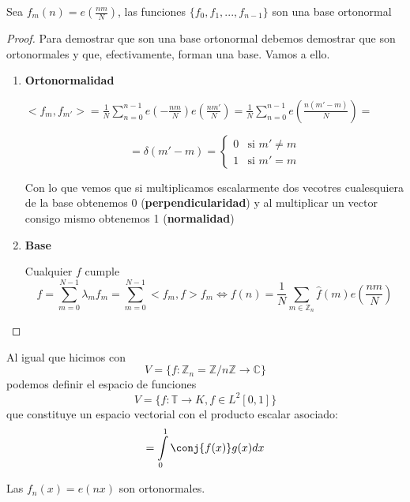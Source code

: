 \begin{prop}
	Sea $f_m(n) = e\left(\frac{nm}{N} \right) $, las funciones $\{ f_0, f_1, ..., f_{n-1}\}$ son una base ortonormal

\end{prop}

\begin{proof}
	Para demostrar que son una base ortonormal debemos demostrar que son ortonormales y que, efectivamente, forman una base. Vamos a ello.

	\begin{enumerate}
	\item \textbf{Ortonormalidad}

	$<f_m, f_{m'}> = \frac{1}{N} \sum^{n-1}_{n = 0} e \left(-\frac{nm}{N} \right) e \left(\frac{nm'}{N} \right) = \frac{1}{N} \sum^{n-1}_{n = 0} e \left( \frac{n (m' - m)}{N} \right) =$

	$$ = \delta (m' - m) = \begin{cases}
		0 & \mbox{si } m' \neq m \\
		1 & \mbox{si } m' = m
	\end{cases}
	$$

	Con lo que vemos que si multiplicamos escalarmente dos vecotres cualesquiera de la base obtenemos 0 (\textbf{perpendicularidad}) y al multiplicar un vector consigo mismo obtenemos 1 (\textbf{normalidad})

	\item \textbf{Base}

	Cualquier $f$ cumple
	\[f = \sum^{N - 1}_{m = 0} \lambda_m f_m = \sum^{N - 1}_{m = 0} <f_m, f> f_m \iff f(n) = \frac{1}{N} \sum_{m \in \mathbb{Z}_n} \hat{f}(m) e\left(\frac{nm}{N}\right) \]
	\end{enumerate}

\end{proof}


Al igual que hicimos con
\[V = \{f: \mathbb{Z}_n = \mathbb{Z}/n\mathbb{Z} \rightarrow \mathbb{C} \} \]
podemos definir el espacio de funciones
\[V = \{ f: \mathbb{T} \rightarrow K, f \in L^2 [0,1]\}\]
que constituye un espacio vectorial con el producto escalar asociado:
\[<f,g> = \int\limits^{1}_0 \conj{f(x)} g(x) dx\]

\begin{prop}
	Las $f_n(x) = e(nx)$ son ortonormales.

\end{prop}

